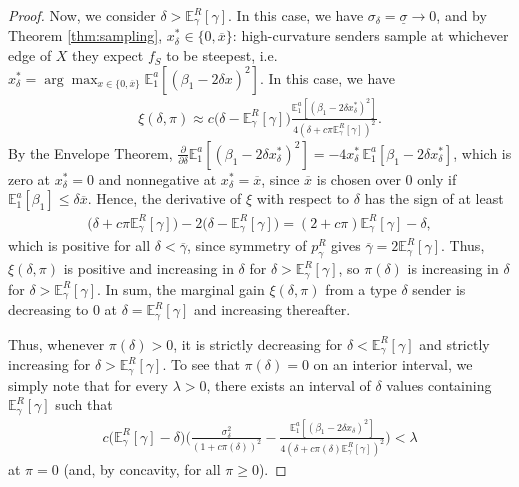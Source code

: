 \documentclass[11pt,dvipsnames]{article}
\begin{document}
\begin{appendix}
\begin{proof}
Now, we consider $\delta > \mathbb{E}_\gamma^R[\gamma]$.
In this case, we have $\sigma_\delta = \underline{\sigma}\to 0$, and by Theorem \ref{thm:sampling}, $x_\delta^*\in\{0,\overline{x}\}$: high-curvature senders sample at whichever edge of $X$ they expect $f_S$ to be steepest, i.e. $x_\delta^* = \arg\max_{x \in \{0,\overline{x}\}} \mathbb{E}_1^a[(\beta_1-2\delta x)^2]$.
In this case, we have
\begin{align*}
\xi(\delta,\pi) \approx 	c\big(\delta-\mathbb{E}_\gamma^R[\gamma]\big)
\frac{\mathbb{E}_1^a[(\beta_1-2\delta x_\delta^*)^2]}{4(\delta + c\pi \mathbb{E}_\gamma^R[\gamma])^2}.
\end{align*}
By the Envelope Theorem, $\frac{\partial}{\partial\delta}\mathbb{E}_1^a[(\beta_1-2\delta x_\delta^*)^2] = -4x_\delta^*\,\mathbb{E}_1^a[\beta_1-2\delta x_\delta^*]$, which is zero at $x_\delta^*=0$ and nonnegative at $x_\delta^*=\overline{x}$, since $\overline{x}$ is chosen over $0$ only if $\mathbb{E}_1^a[\beta_1]\le\delta\overline{x}$.
Hence, the derivative of $\xi$ with respect to $\delta$ has the sign of at least
\begin{align*}
\big(\delta+c\pi\mathbb{E}_\gamma^R[\gamma]\big)-2\big(\delta-\mathbb{E}_\gamma^R[\gamma]\big)
= (2+c\pi)\mathbb{E}_\gamma^R[\gamma]-\delta,
\end{align*}
which is positive for all $\delta<\overline{\gamma}$, since symmetry of $p_\gamma^R$ gives $\overline{\gamma}=2\mathbb{E}_\gamma^R[\gamma]$.
Thus, $\xi(\delta,\pi)$ is positive and increasing in $\delta$ for $\delta > \mathbb{E}_\gamma^R[\gamma]$, so $\pi(\delta)$ is increasing in $\delta$ for $\delta > \mathbb{E}_\gamma^R[\gamma]$.
In sum, the marginal gain $\xi(\delta,\pi)$ from a type $\delta$ sender is decreasing to $0$ at $\delta=\mathbb{E}_\gamma^R[\gamma]$ and increasing thereafter.

Thus, whenever $\pi(\delta)>0$, it is strictly decreasing for $\delta < \mathbb{E}_\gamma^R[\gamma]$ and strictly increasing for $\delta >  \mathbb{E}_\gamma^R[\gamma]$.
To see that $\pi(\delta) = 0$ on an interior interval, we simply note that for every $\lambda > 0$, there exists an interval of $\delta$ values containing $\mathbb{E}_\gamma^R[\gamma]$ such that
\begin{align*}
c\big(\mathbb{E}_\gamma^R[\gamma]-\delta\big)
\big(\frac{\sigma_\delta^2}{(1+c\pi(\delta))^2}
-\frac{\mathbb{E}_1^a[(\beta_1-2\delta x_\delta)^2]}{4(\delta + c\pi(\delta)\mathbb{E}_\gamma^R[\gamma])^2}\big)
< \lambda
\end{align*}
at $\pi = 0$ (and, by concavity, for all $\pi \geq 0$).
\end{proof}




\end{appendix}
\end{document}
